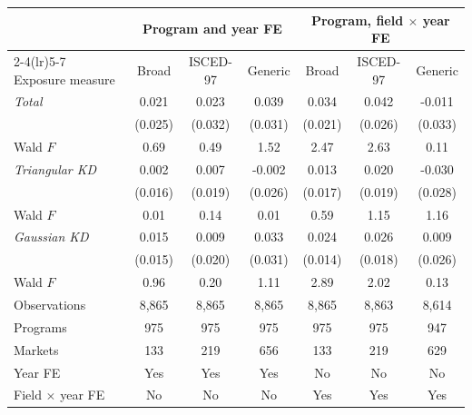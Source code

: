 \begin{tabular}{lcccccc}
\toprule
 & \multicolumn{3}{c}{Program and year FE} & \multicolumn{3}{c}{Program, field \(\times\) year FE} \\
\cmidrule(lr){2-4}\cmidrule(lr){5-7}
Exposure measure & Broad & ISCED-97 & Generic & Broad & ISCED-97 & Generic \\
\midrule
\textit{Total} &  0.021 &  0.023 &  0.039 &  0.034 &  0.042 & -0.011 \\
 & (0.025) & (0.032) & (0.031) & (0.021) & (0.026) & (0.033) \\
\quad Wald \(F\) &  0.69 &  0.49 &  1.52 &  2.47 &  2.63 &  0.11 \\
\addlinespace
\textit{Triangular KD} &  0.002 &  0.007 & -0.002 &  0.013 &  0.020 & -0.030 \\
 & (0.016) & (0.019) & (0.026) & (0.017) & (0.019) & (0.028) \\
\quad Wald \(F\) &  0.01 &  0.14 &  0.01 &  0.59 &  1.15 &  1.16 \\
\addlinespace
\textit{Gaussian KD} &  0.015 &  0.009 &  0.033 &  0.024\sym{*} &  0.026 &  0.009 \\
 & (0.015) & (0.020) & (0.031) & (0.014) & (0.018) & (0.026) \\
\quad Wald \(F\) &  0.96 &  0.20 &  1.11 &  2.89 &  2.02 &  0.13 \\
\midrule
Observations &     8,865 &     8,865 &     8,865 &     8,865 &     8,863 &     8,614 \\
Programs &       975 &       975 &       975 &       975 &       975 &       947 \\
Markets &       133 &       219 &       656 &       133 &       219 &       629 \\
Year FE & Yes & Yes & Yes & No & No & No \\
Field \(\times\) year FE & No & No & No & Yes & Yes & Yes \\
\bottomrule
\end{tabular}
